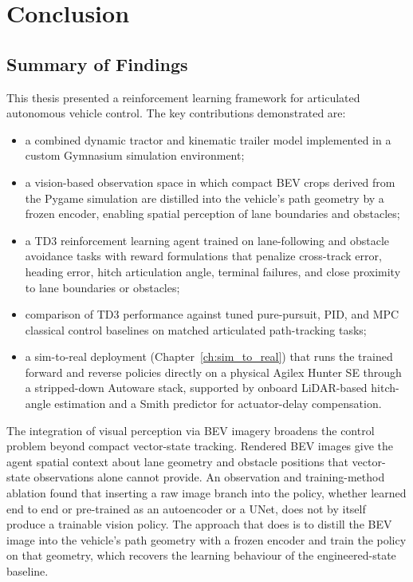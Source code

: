 \chapter{Conclusion}
\label{ch:conclusion}

\section{Summary of Findings}

This thesis presented a reinforcement learning framework for articulated autonomous vehicle control. The key contributions demonstrated are:
\begin{itemize}
    \item a combined dynamic tractor and kinematic trailer model implemented in a custom Gymnasium simulation environment;
    \item a vision-based observation space in which compact BEV crops derived from the Pygame simulation are distilled into the vehicle's path geometry by a frozen encoder, enabling spatial perception of lane boundaries and obstacles;
    \item a TD3 reinforcement learning agent trained on lane-following and obstacle avoidance tasks with reward formulations that penalize cross-track error, heading error, hitch articulation angle, terminal failures, and close proximity to lane boundaries or obstacles;
    \item comparison of TD3 performance against tuned pure-pursuit, PID, and MPC classical control baselines on matched articulated path-tracking tasks;
    \item a sim-to-real deployment (Chapter~\ref{ch:sim_to_real}) that runs the trained forward and reverse policies directly on a physical Agilex Hunter SE through a stripped-down Autoware stack, supported by onboard LiDAR-based hitch-angle estimation and a Smith predictor for actuator-delay compensation.
\end{itemize}

The integration of visual perception via BEV imagery broadens the control problem beyond compact vector-state tracking. Rendered BEV images give the agent spatial context about lane geometry and obstacle positions that vector-state observations alone cannot provide. An observation and training-method ablation found that inserting a raw image branch into the policy, whether learned end to end or pre-trained as an autoencoder or a UNet, does not by itself produce a trainable vision policy. The approach that does is to distill the BEV image into the vehicle's path geometry with a frozen encoder and train the policy on that geometry, which recovers the learning behaviour of the engineered-state baseline.

